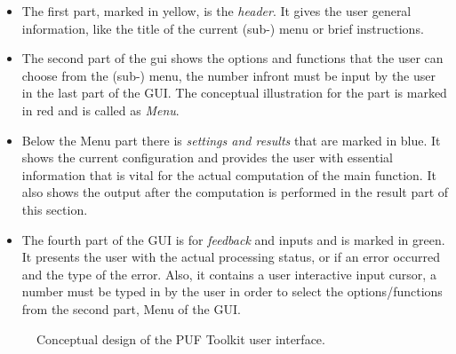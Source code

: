 \begin{itemize}
	\item The first part, marked in yellow, is the \emph{header}. It gives the user general information, like the title of the current (sub-) menu or brief instructions.
	\item The second part of the gui shows the options and functions that the user can choose from the (sub-) menu, the number infront must be input by the user in the last part of the GUI. The conceptual illustration for the part is marked in red and is called as \emph{Menu}.
	\item Below the Menu part there is \emph{settings and results} that are marked in blue. It shows the current configuration and provides the user with essential information that is vital for the actual computation of the main function. It also shows the output after the computation is performed in the result part of this section.
	\item The fourth part of the GUI is for \emph{feedback} and inputs and is marked in green. It presents the user with the actual processing status, or if an error occurred and the type of the error. Also, it contains a user interactive input cursor, a number must be typed in by the user in order to select the options/functions from the second part, Menu of the GUI.
\end{itemize}

\begin{figure}
\centering
{}
\caption{Conceptual design of the PUF Toolkit user interface.}
\label{img:gui_design}
\end{figure}


